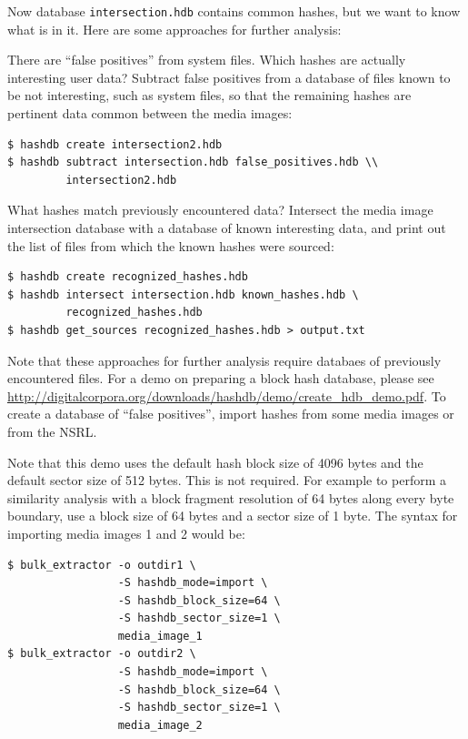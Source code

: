 \documentclass[12pt,twoside]{article}
\begin{document}
Now database \texttt{intersection.hdb} contains common hashes,
but we want to know what is in it.
Here are some approaches for further analysis:
\begin{compactitem}
\item There are ``false positives'' from system files.
Which hashes are actually interesting user data?
Subtract false positives from a database of files known to be not interesting,
such as system files,
so that the remaining hashes are pertinent data common between the
media images:
\begin{verbatim}
$ hashdb create intersection2.hdb
$ hashdb subtract intersection.hdb false_positives.hdb \\
         intersection2.hdb
\end{verbatim}

\item What hashes match previously encountered data?
Intersect the media image intersection database
with a database of known interesting data,
and print out the list of files from which the known hashes were sourced:
\begin{verbatim}
$ hashdb create recognized_hashes.hdb
$ hashdb intersect intersection.hdb known_hashes.hdb \
         recognized_hashes.hdb
$ hashdb get_sources recognized_hashes.hdb > output.txt
\end{verbatim}
\end{compactitem}

Note that these approaches for further analysis require
databaes of previously encountered files.
For a demo on preparing a block hash database, please see
\url{http://digitalcorpora.org/downloads/hashdb/demo/create\_hdb\_demo.pdf}.
To create a database of ``false positives'',
import hashes from some media images or from the NSRL.

Note that this demo uses the default hash block size of 4096 bytes
and the default sector size of 512 bytes.
This is not required.
For example to perform a similarity analysis
with a block fragment resolution of 64 bytes along every byte boundary,
use a block size of 64 bytes and a sector size of 1 byte.
The syntax for importing media images 1 and 2 would be:
\begin{verbatim}
$ bulk_extractor -o outdir1 \
                 -S hashdb_mode=import \
                 -S hashdb_block_size=64 \
                 -S hashdb_sector_size=1 \
                 media_image_1
$ bulk_extractor -o outdir2 \
                 -S hashdb_mode=import \
                 -S hashdb_block_size=64 \
                 -S hashdb_sector_size=1 \
                 media_image_2
\end{verbatim}
\end{document}
